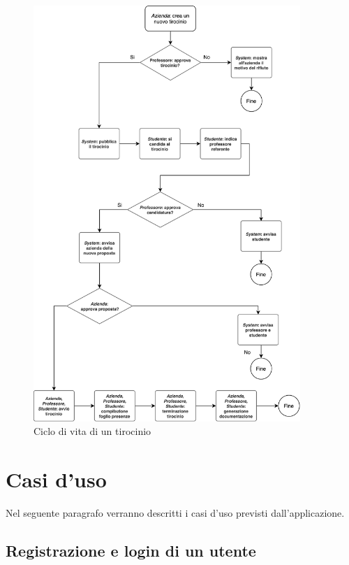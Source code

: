 \begin{figure}[H]
	\centering
	\includegraphics[width=0.9\textwidth]{Chapter3/Figs/states-flaw}
	\caption[Ciclo di vita di un tirocinio]{Ciclo di vita di un tirocinio}
	\label{fig:workflaw}
\end{figure}

\section{Casi d'uso}

Nel seguente paragrafo verranno descritti i casi d'uso previsti dall'applicazione.

\subsection{Registrazione e login di un utente}\label{sec:registrazione-e-login-di-un-utente}

